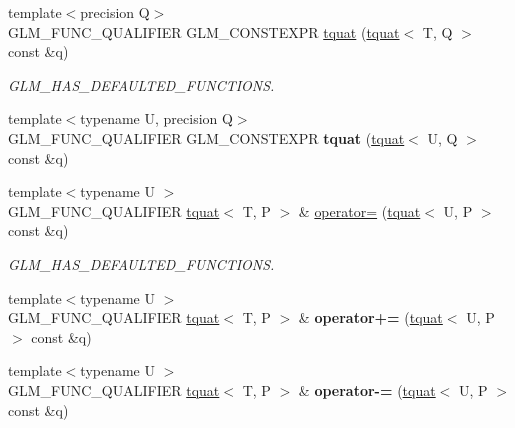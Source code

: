 \begin{DoxyCompactItemize}
\mbox{\label{structglm_1_1tquat_ac5c48665db8dff83698487153ee5b1fc}} 
{\footnotesize template$<$precision Q$>$ }\\G\+L\+M\+\_\+\+F\+U\+N\+C\+\_\+\+Q\+U\+A\+L\+I\+F\+I\+ER G\+L\+M\+\_\+\+C\+O\+N\+S\+T\+E\+X\+PR \hyperlink{structglm_1_1tquat_ac5c48665db8dff83698487153ee5b1fc}{tquat} (\hyperlink{structglm_1_1tquat}{tquat}$<$ T, Q $>$ const \&q)
\begin{DoxyCompactList}\small\item\em G\+L\+M\+\_\+\+H\+A\+S\+\_\+\+D\+E\+F\+A\+U\+L\+T\+E\+D\+\_\+\+F\+U\+N\+C\+T\+I\+O\+NS. \end{DoxyCompactList}\item 
\mbox{\label{structglm_1_1tquat_a589082b40e5b4c24c6fa6cbc4bd9dea3}} 
{\footnotesize template$<$typename U, precision Q$>$ }\\G\+L\+M\+\_\+\+F\+U\+N\+C\+\_\+\+Q\+U\+A\+L\+I\+F\+I\+ER G\+L\+M\+\_\+\+C\+O\+N\+S\+T\+E\+X\+PR {\bfseries tquat} (\hyperlink{structglm_1_1tquat}{tquat}$<$ U, Q $>$ const \&q)
\item 
\mbox{\label{structglm_1_1tquat_a280d36cd56dabfc93402adb201e87e63}} 
{\footnotesize template$<$typename U $>$ }\\G\+L\+M\+\_\+\+F\+U\+N\+C\+\_\+\+Q\+U\+A\+L\+I\+F\+I\+ER \hyperlink{structglm_1_1tquat}{tquat}$<$ T, P $>$ \& \hyperlink{structglm_1_1tquat_a280d36cd56dabfc93402adb201e87e63}{operator=} (\hyperlink{structglm_1_1tquat}{tquat}$<$ U, P $>$ const \&q)
\begin{DoxyCompactList}\small\item\em G\+L\+M\+\_\+\+H\+A\+S\+\_\+\+D\+E\+F\+A\+U\+L\+T\+E\+D\+\_\+\+F\+U\+N\+C\+T\+I\+O\+NS. \end{DoxyCompactList}\item 
\mbox{\label{structglm_1_1tquat_a90b089779296e6f39f7aa9cddaf3ce83}} 
{\footnotesize template$<$typename U $>$ }\\G\+L\+M\+\_\+\+F\+U\+N\+C\+\_\+\+Q\+U\+A\+L\+I\+F\+I\+ER \hyperlink{structglm_1_1tquat}{tquat}$<$ T, P $>$ \& {\bfseries operator+=} (\hyperlink{structglm_1_1tquat}{tquat}$<$ U, P $>$ const \&q)
\item 
\mbox{\label{structglm_1_1tquat_a515509c2907fd29e76b0575271a48c2d}} 
{\footnotesize template$<$typename U $>$ }\\G\+L\+M\+\_\+\+F\+U\+N\+C\+\_\+\+Q\+U\+A\+L\+I\+F\+I\+ER \hyperlink{structglm_1_1tquat}{tquat}$<$ T, P $>$ \& {\bfseries operator-\/=} (\hyperlink{structglm_1_1tquat}{tquat}$<$ U, P $>$ const \&q)

\end{DoxyCompactItemize}
